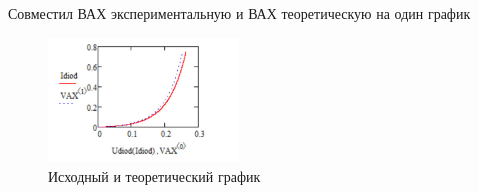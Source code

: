 \noindent Совместил ВАХ экспериментальную и ВАХ теоретическую на один график
\begin{figure}[H]
	\centering
	\includegraphics[width=0.45\textwidth]{img/06_mathcad.jpg}
	\captionsetup{font=footnotesize}
	\caption{Исходный и теоретический график}
	\label{fig:06mathcad}
\end{figure}
